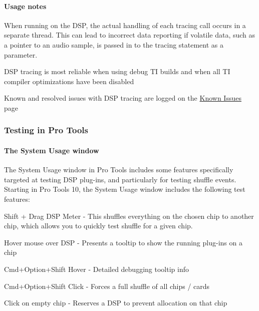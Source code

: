 \hypertarget{a00362_subsubsection__usage_notes_}{}\paragraph{Usage notes}\label{a00362_subsubsection__usage_notes_}

\begin{DoxyItemize}
\item When running on the D\+S\+P, the actual handling of each tracing call occurs in a separate thread. This can lead to incorrect data reporting if volatile data, such as a pointer to an audio sample, is passed in to the tracing statement as a parameter.  
\item D\+S\+P tracing is most reliable when using debug T\+I builds and when all T\+I compiler optimizations have been disabled  
\item Known and resolved issues with D\+S\+P tracing are logged on the \hyperlink{a00374}{Known Issues} page  
\end{DoxyItemize}

\hypertarget{a00362_subsection__testing_in_pro_tools}{}\subsubsection{Testing in Pro Tools}\label{a00362_subsection__testing_in_pro_tools}
 \hypertarget{a00362_subsubsection__the_system_usage_window_}{}\paragraph{The System Usage window}\label{a00362_subsubsection__the_system_usage_window_}
 The System Usage window in Pro Tools includes some features specifically targeted at testing D\+S\+P plug-\/ins, and particularly for testing shuffle events. Starting in Pro Tools 10, the System Usage window includes the following test features\+: 
\begin{DoxyItemize}
\item Shift + Drag D\+S\+P Meter -\/ This shuffles everything on the chosen chip to another chip, which allows you to quickly test shuffle for a given chip.  
\item Hover mouse over D\+S\+P -\/ Presents a tooltip to show the running plug-\/ins on a chip  
\item Cmd+\+Option+\+Shift Hover -\/ Detailed debugging tooltip info  
\item Cmd+\+Option+\+Shift Click -\/ Forces a full shuffle of all chips / cards 
\item Click on empty chip -\/ Reserves a D\+S\+P to prevent allocation on that chip 
\end{DoxyItemize}

